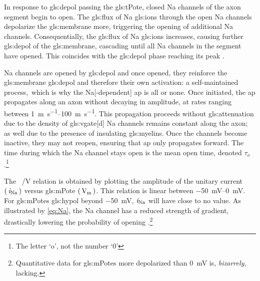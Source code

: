 \documentclass[class={myRUCProject}, crop=false]{standalone}
\begin{document}
In response to \gls{gls:depol} passing the \gls{gls:tPote}, closed \gls{Na} channels of the axon segment begin to open. The \gls{gls:flux} of \gls{Na} \glspl{gls:ion} through the open \gls{Na} channels depolarize the \gls{gls:membrane} more, triggering the opening of additional \gls{Na} channels. 
Consequentially, the \gls{gls:flux} of \gls{Na} \glspl{gls:ion} increases, causing further \gls{gls:depol} of the \gls{gls:membrane}, cascading until all \gls{Na} channels in the segment have opened. 
This coincides with the \gls{gls:depol} phase reaching its peak \cite{}. 

{}\gls{Na} channels are opened by \gls{gls:depol} and once opened, they reinforce the \gls{gls:membrane} \gls{gls:depol} and therefore their own activation: a self-maintained process,\footnotemark~which is why the \gls{Na}[-dependent] \gls{ap} is all or none.
Once initiated, the \gls{ap} propagates along an axon without decaying in amplitude, at rates ranging between \qtyrange{1}{100}{\meter\per\s}. 
This propagation proceeds without \gls{gls:attenuation} due to the density of \gls{gls:vgate}[d] \gls{Na} channels remains constant along the axon; as well due to the presence of insulating \glspl{gls:myelin}. 
Once the channels become inactive, they may not reopen, ensuring that \gls{ap} only propagates forward. 
The time during which the \gls{Na} channel stays open is the mean open time, denoted \(\tau_o\) \cite{}.\footnote{The letter  `o', not the number `0'}

The \unit[per-mode = symbol]{\ucur\sodium\per\V} relation is obtained by plotting the amplitude of the unitary current \(\left(\,\mathit{i}_\mathrm{Na}\,\right)\) versus \gls{gls:mPote} \(\br{\unit{\V\membrane}}\). This relation is linear between \qtyrange{-50}{0}{\mV}. For \glspl{gls:mPote} \gls{gls:hypol} beyond \qty{-50}{\mV}, \(\mathit{i}_\mathrm{Na}\) will have close to no value. As illustrated by \cref{eq:Na}, the \gls{Na} channel has a reduced strength of gradient, drastically lowering the probability of opening \cite{}.\footnote{Quantitative data for \glspl{gls:mPote} more depolarized than \qty{0}{\mV} is, \emph{bizarrely}, lacking.}
\end{document}

